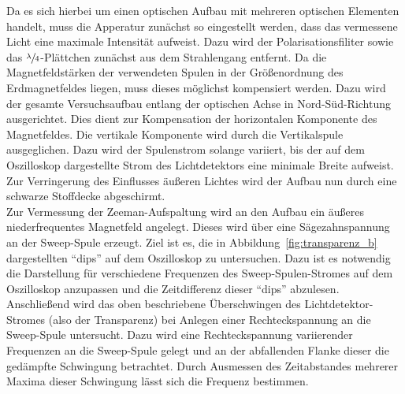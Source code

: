 {Da es sich hierbei um einen optischen Aufbau mit mehreren optischen Elementen handelt, muss die Apperatur zunächst so eingestellt werden, dass das vermessene Licht eine maximale Intensität aufweist. Dazu wird der Polarisationsfiliter sowie das $\sfrac{\lambda}{4}$-Plättchen zunächst aus dem Strahlengang entfernt. Da die Magnetfeldstärken der verwendeten Spulen in der Größenordnung des Erdmagnetfeldes liegen, muss dieses möglichst kompensiert werden. Dazu wird der gesamte Versuchsaufbau entlang der optischen Achse in Nord-Süd-Richtung ausgerichtet. Dies dient zur Kompensation der horizontalen Komponente des Magnetfeldes. Die vertikale Komponente wird durch die Vertikalspule ausgeglichen. Dazu wird der Spulenstrom solange variiert, bis der auf dem Oszilloskop dargestellte Strom des Lichtdetektors eine minimale Breite aufweist. Zur Verringerung des Einflusses äußeren Lichtes wird der Aufbau nun durch eine schwarze Stoffdecke abgeschirmt.\\
Zur Vermessung der Zeeman-Aufspaltung wird an den Aufbau ein äußeres niederfrequentes Magnetfeld angelegt. Dieses wird über eine Sägezahnspannung an der Sweep-Spule erzeugt. Ziel ist es, die in Abbildung~\ref{fig:transparenz_b} dargestellten \enquote{dips} auf dem Oszilloskop zu untersuchen. Dazu ist es notwendig die Darstellung für verschiedene Frequenzen des Sweep-Spulen-Stromes auf dem Oszilloskop anzupassen und die Zeitdifferenz dieser \enquote{dips} abzulesen.\\
Anschließend wird das oben beschriebene Überschwingen des Lichtdetektor-Stromes (also der Transparenz) bei Anlegen einer Rechteckspannung an die Sweep-Spule untersucht. Dazu wird eine Rechteckspannung variierender Frequenzen an die Sweep-Spule gelegt und an der abfallenden Flanke dieser die gedämpfte Schwingung betrachtet. Durch Ausmessen des Zeitabstandes mehrerer Maxima dieser Schwingung lässt sich die Frequenz bestimmen.}
